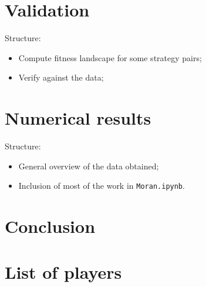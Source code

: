 \documentclass{article}
\begin{document}
\section{Validation}\label{sec:validation}

Structure:

\begin{itemize}
    \item Compute fitness landscape for some strategy pairs;
    \item Verify against the data;
\end{itemize}

\section{Numerical results}\label{sec:numerical_results}

Structure:

\begin{itemize}
    \item General overview of the data obtained;
    \item Inclusion of most of the work in \texttt{Moran.ipynb}.
\end{itemize}

\section{Conclusion}\label{sec:conclusion}




\appendix

\section{List of players}\label{app:list_of_players}

\begin{multicols}{3}
	\begin{enumerate}
		
	\end{enumerate}
\end{multicols}
\end{document}
